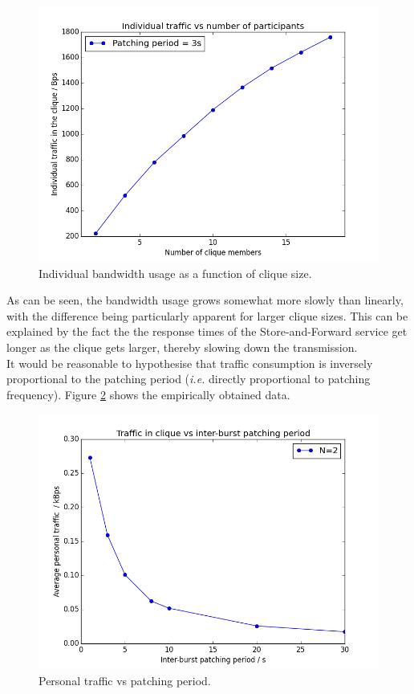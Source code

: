 \documentclass[a4paper, 12pt]{report}
\begin{document}
\begin{figure}[H]
    \captionsetup{width=0.9\textwidth}
    \centering
    \includegraphics[width=0.70\linewidth]{pics/eval/traf_vs_N.png}
    \caption{\label{fig:traf_vs_N} Individual bandwidth usage as a function of clique size.}
\end{figure}

As can be seen, the bandwidth usage grows somewhat more slowly than linearly, with the difference being particularly apparent for larger clique sizes. This can be explained by the fact the the response times of the Store-and-Forward service get longer as the clique gets larger, thereby slowing down the transmission. \\

It would be reasonable to hypothesise that traffic consumption is inversely proportional to the patching period (\textit{i.e.} directly proportional to patching frequency). Figure \ref{fig:traf_vs_period} shows the empirically obtained data.

\begin{figure}[H]
    \captionsetup{width=0.9\textwidth}
    \centering
    \includegraphics[width=0.70\linewidth]{pics/eval/traf_vs_period.png}
    \caption{\label{fig:traf_vs_period} Personal traffic vs patching period.}
\end{figure}
\end{document}
